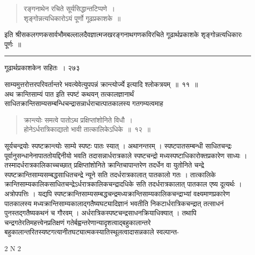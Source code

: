 \documentclass[11pt, openany]{book}
\begin{document}
 \begin{quote}
{\qt  रङ्गनाथेन रचिते सूर्यसिद्धान्तटिप्पणे~।\\
 शृङ्गोन्नत्यधिकारोऽयं पूर्णो गूढप्रकाशके~॥ }
\end{quote}
इति श्रीसकलगणकसार्वभौमबल्लालदैवज्ञात्मजखरङ्गनाथगणकविरचिते गूढार्थप्रकाशके शृङ्गोन्नत्यधिकारः पूर्णः~॥ 



\begin{center}
\noindent\rule{8em}{.5pt}
\end{center}

\newpage

 \hspace{3cm} गूढार्थप्रकाशकेन सहितः~। \hfill २७३
\vspace{1cm}


\noindent साम्यमुत्तरोत्तरपरिवर्तान्तरे भवत्येवेत्युपपन्नं क्रान्त्योर्ज्ये इत्यादि श्लोकत्रयम्~॥~११~॥\\
\noindent अथ क्रान्तिसाम्यं पात इति स्पष्टं कथयन् तत्कालज्ञानार्थं साधितक्रान्तिसाम्यसम्बन्धिचन्द्रासन्नार्धराचात्पातकालस्य गतगम्यत्वमाह\textendash

\begin{quote}
{\ssi क्रान्त्योः समत्वे पातोऽथ प्रक्षिप्तांशोनिते विधौ~।\\
होनेऽर्धरात्रिकाद्यातो भावी तात्कालिकेऽधिके~॥~१२~॥ }
\end{quote}
सूर्यचन्द्रयोः स्पष्टक्रान्त्योः साम्ये स्पष्टः पातः स्यात् । अथानन्तरम् । स्पष्टपातसम्बन्धी साधितचन्द्रः पूर्वानुसन्धानेनापाततोयद्दिनीयो भवति तदासन्नार्धरात्रकाले स्पष्टचन्द्रो मध्यस्पष्टाधिकारोक्तप्रकारेण साध्यः । तस्मादर्धरात्रकालिकाच्चच्छात् प्रक्षिप्तांशोनिते क्रान्तिचापान्तरेण तदर्धेन वा युतोनिते चन्द्रे स्पष्टक्रान्तिसाम्यसम्बद्धसाधितचन्द्रे न्यूने सति तदर्धरात्रकालात् पातकालो गतः । तात्कालिके क्रान्तिसाम्यकालिकसाधितचन्द्रेऽर्धरात्रकालिकचन्द्रादधिके सति तदर्धरात्रकालात् पातकाल एष्य दूत्यर्थः । अत्रोपपत्तिः । यद्यपि स्पष्टक्रान्तिसाम्यसम्बद्धचन्द्रमध्यक्रान्तिसाम्यकालिकचन्द्राभ्यां वक्ष्यमाणप्रकारेण पातकालस्य मध्यक्रान्तिसाम्यकालाद्गतैष्यघट्यादिज्ञानं भवतीति निकटार्धरात्रिकचन्द्रात् तत्साधनं पुनस्तद्गतैष्यकथनं च गौरवम् । अर्धरात्रिकस्पष्टचन्द्रसाधनक्रियाधिक्यात् । तथापि चन्द्रगतेरतिमहत्त्वेनप्रतिक्षणं गतेर्बह्वन्तरेणान्यादृशत्वाद्बहुकालान्तरे बहुकालान्तरितस्यष्टगत्यानीतघट्यात्मकस्यातिस्थूलत्वादासन्नकाले स्वल्पान्त-


{\tiny{2 N 2}}
\end{document}
